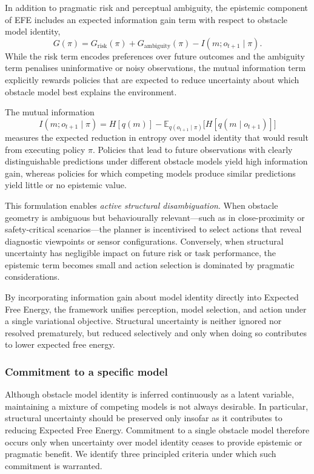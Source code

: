 \documentclass[a4paper, twoside]{article}
\begin{document}
In addition to pragmatic risk and perceptual ambiguity, the epistemic component of EFE
includes an expected information gain term with respect to obstacle model identity,
\begin{equation}
\label{eq:efe_with_model_epistemic}
G(\pi)
=
G_{\text{risk}}(\pi)
+
G_{\text{ambiguity}}(\pi)
-
I(m; o_{t+1} \mid \pi).
\end{equation}
While the risk term encodes preferences over future outcomes and the ambiguity term penalises
uninformative or noisy observations, the mutual information term explicitly rewards policies
that are expected to reduce uncertainty about which obstacle model best explains the
environment.

The mutual information
\begin{equation}
\label{eq:model_mutual_information}
I(m; o_{t+1} \mid \pi)
=
H[q(m)]
-
\mathbb{E}_{q(o_{t+1} \mid \pi)}
\big[
H[q(m \mid o_{t+1})]
\big]
\end{equation}
measures the expected reduction in entropy over model identity that would result from
executing policy $\pi$.
Policies that lead to future observations with clearly distinguishable predictions under
different obstacle models yield high information gain, whereas policies for which competing
models produce similar predictions yield little or no epistemic value.

This formulation enables \emph{active structural disambiguation}.
When obstacle geometry is ambiguous but behaviourally relevant—such as in close-proximity or
safety-critical scenarios—the planner is incentivised to select actions that reveal
diagnostic viewpoints or sensor configurations.
Conversely, when structural uncertainty has negligible impact on future risk or task
performance, the epistemic term becomes small and action selection is dominated by pragmatic
considerations.

By incorporating information gain about model identity directly into Expected Free Energy,
the framework unifies perception, model selection, and action under a single variational
objective.
Structural uncertainty is neither ignored nor resolved prematurely, but reduced
selectively and only when doing so contributes to lower expected free energy.


\subsubsection{Commitment to a specific model}
\label{sec:model_commitment}

Although obstacle model identity is inferred continuously as a latent variable, maintaining
a mixture of competing models is not always desirable.
In particular, structural uncertainty should be preserved only insofar as it contributes
to reducing Expected Free Energy.
Commitment to a single obstacle model therefore occurs only when uncertainty over model
identity ceases to provide epistemic or pragmatic benefit.
We identify three principled criteria under which such commitment is warranted.
\end{document}

